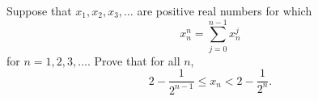 Suppose that $x_1, x_2, x_3, \ldots$ are positive real numbers for which
\[ x_n^n = \sum_{j=0}^{n-1} x_n^j \]
for $n = 1, 2, 3, \ldots$. Prove that for all $n$,
\[ 2 - \frac{1}{2^{n-1}} \leq x_n < 2 - \frac{1}{2^n}. \]
